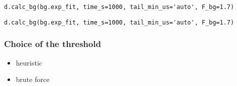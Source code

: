 \verb|d.calc_bg(bg.exp_fit, time_s=1000, tail_min_us='auto', F_bg=1.7)|

\verb|d.calc_bg(bg.exp_fit, time_s=1000, tail_min_us='auto', F_bg=1.7)|

\subsubsection{Choice of the threshold}
\begin{itemize}
\item heuristic
\item brute force
\end{itemize}

